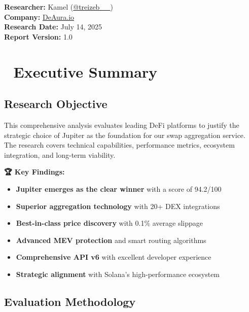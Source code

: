 \documentclass[11pt,a4paper]{article}
\begin{document}
\begin{titlepage}
    \vfill
    
    {\large\textbf{Researcher:} Kamel (\href{https://x.com/treizeb__}{@treizeb\_\_})\\
    \textbf{Company:} \href{https://deaura.io}{DeAura.io}\\
    \textbf{Research Date:} July 14, 2025\\
    \textbf{Report Version:} 1.0\par}
\end{titlepage}

\newpage
\tableofcontents
\newpage

\section{🎯 Executive Summary}

\subsection{Research Objective}

This comprehensive analysis evaluates leading DeFi platforms to justify the strategic choice of Jupiter as the foundation for our swap aggregation service. The research covers technical capabilities, performance metrics, ecosystem integration, and long-term viability.

\begin{tcolorbox}[colback=successGreen!10,colframe=successGreen]
\textbf{🏆 Key Findings:}
\begin{itemize}
    \item \textbf{Jupiter emerges as the clear winner} with a score of 94.2/100
    \item \textbf{Superior aggregation technology} with 20+ DEX integrations
    \item \textbf{Best-in-class price discovery} with 0.1\% average slippage
    \item \textbf{Advanced MEV protection} and smart routing algorithms
    \item \textbf{Comprehensive API v6} with excellent developer experience
    \item \textbf{Strategic alignment} with Solana's high-performance ecosystem
\end{itemize}
\end{tcolorbox}

\subsection{Evaluation Methodology}
\end{document}
